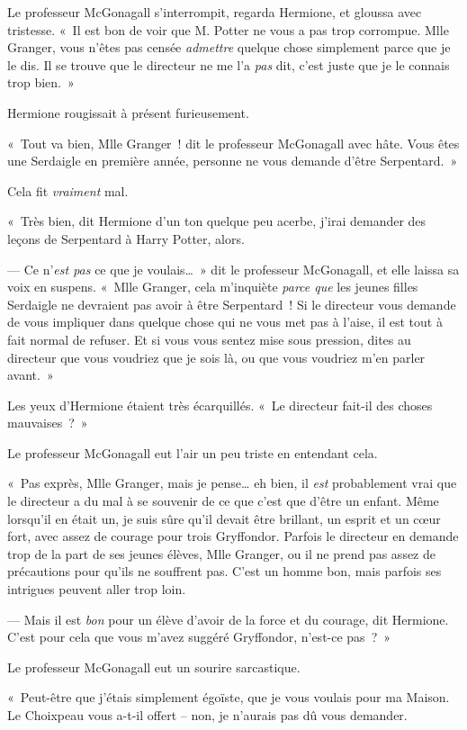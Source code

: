 Le professeur McGonagall s'interrompit, regarda Hermione, et gloussa avec tristesse. «~Il est bon de voir que M. Potter ne vous a pas trop corrompue. Mlle Granger, vous n'êtes pas censée \emph{admettre} quelque chose simplement parce que je le dis. Il se trouve que le directeur ne me l'a \emph{pas} dit, c'est juste que je le connais trop bien.~»

Hermione rougissait à présent furieusement.

«~Tout va bien, Mlle Granger~! dit le professeur McGonagall avec hâte. Vous êtes une Serdaigle en première année, personne ne vous demande d'être Serpentard.~»

Cela fit \emph{vraiment} mal.

«~Très bien, dit Hermione d'un ton quelque peu acerbe, j'irai demander des leçons de Serpentard à Harry Potter, alors.

--- Ce n'\emph{est pas} ce que je voulais…~» dit le professeur McGonagall, et elle laissa sa voix en suspens. «~Mlle Granger, cela m'inquiète \emph{parce que} les jeunes filles Serdaigle ne devraient pas avoir à être Serpentard~! Si le directeur vous demande de vous impliquer dans quelque chose qui ne vous met pas à l'aise, il est tout à fait normal de refuser. Et si vous vous sentez mise sous pression, dites au directeur que vous voudriez que je sois là, ou que vous voudriez m'en parler avant.~»

Les yeux d'Hermione étaient très écarquillés. «~Le directeur fait-il des choses mauvaises~?~»

Le professeur McGonagall eut l'air un peu triste en entendant cela.

«~Pas exprès, Mlle Granger, mais je pense… eh bien, il \emph{est} probablement vrai que le directeur a du mal à se souvenir de ce que c'est que d'être un enfant. Même lorsqu'il en était un, je suis sûre qu'il devait être brillant, un esprit et un cœur fort, avec assez de courage pour trois Gryffondor. Parfois le directeur en demande trop de la part de ses jeunes élèves, Mlle Granger, ou il ne prend pas assez de précautions pour qu'ils ne souffrent pas. C'est un homme bon, mais parfois ses intrigues peuvent aller trop loin.

--- Mais il est \emph{bon} pour un élève d'avoir de la force et du courage, dit Hermione. C'est pour cela que vous m'avez suggéré Gryffondor, n'est-ce pas~?~»

Le professeur McGonagall eut un sourire sarcastique.

«~Peut-être que j'étais simplement égoïste, que je vous voulais pour ma Maison. Le Choixpeau vous a-t-il offert -- non, je n'aurais pas dû vous demander.

